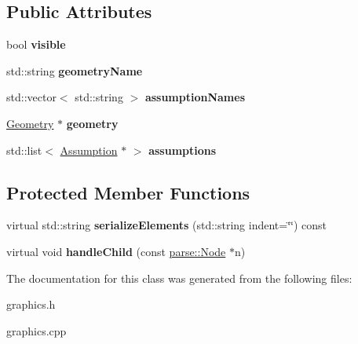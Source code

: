 \subsection*{Public Attributes}
\begin{DoxyCompactItemize}
\item 
\hypertarget{classg2c_1_1_shape_a40588517f441849299c43a80acdfc6d9}{
bool {\bfseries visible}}
\label{classg2c_1_1_shape_a40588517f441849299c43a80acdfc6d9}

\item 
\hypertarget{classg2c_1_1_shape_a549580f86201cd558663ccdb2d0fd4af}{
std::string {\bfseries geometryName}}
\label{classg2c_1_1_shape_a549580f86201cd558663ccdb2d0fd4af}

\item 
\hypertarget{classg2c_1_1_shape_a583dc942f6b2f2c4b6fe4c19c8f6c57c}{
std::vector$<$ std::string $>$ {\bfseries assumptionNames}}
\label{classg2c_1_1_shape_a583dc942f6b2f2c4b6fe4c19c8f6c57c}

\item 
\hypertarget{classg2c_1_1_shape_a7c8a6a3d2a053d73dd9a624f184e12bb}{
\hyperlink{classg2c_1_1_geometry}{Geometry} $\ast$ {\bfseries geometry}}
\label{classg2c_1_1_shape_a7c8a6a3d2a053d73dd9a624f184e12bb}

\item 
\hypertarget{classg2c_1_1_shape_ac589104b26ea0777b5c183d3cf341608}{
std::list$<$ \hyperlink{classg2c_1_1_assumption}{Assumption} $\ast$ $>$ {\bfseries assumptions}}
\label{classg2c_1_1_shape_ac589104b26ea0777b5c183d3cf341608}

\end{DoxyCompactItemize}
\subsection*{Protected Member Functions}
\begin{DoxyCompactItemize}
\item 
\hypertarget{classg2c_1_1_shape_a71a749a93c583fea4bb26f48a0e2fe9e}{
virtual std::string {\bfseries serializeElements} (std::string indent=\char`\"{}\char`\"{}) const }
\label{classg2c_1_1_shape_a71a749a93c583fea4bb26f48a0e2fe9e}

\item 
\hypertarget{classg2c_1_1_shape_ab1070e4d677cb4a0098b11cfe6754cfd}{
virtual void {\bfseries handleChild} (const \hyperlink{classparse_1_1_node}{parse::Node} $\ast$n)}
\label{classg2c_1_1_shape_ab1070e4d677cb4a0098b11cfe6754cfd}

\end{DoxyCompactItemize}


The documentation for this class was generated from the following files:\begin{DoxyCompactItemize}
\item 
graphics.h\item 
graphics.cpp\end{DoxyCompactItemize}
